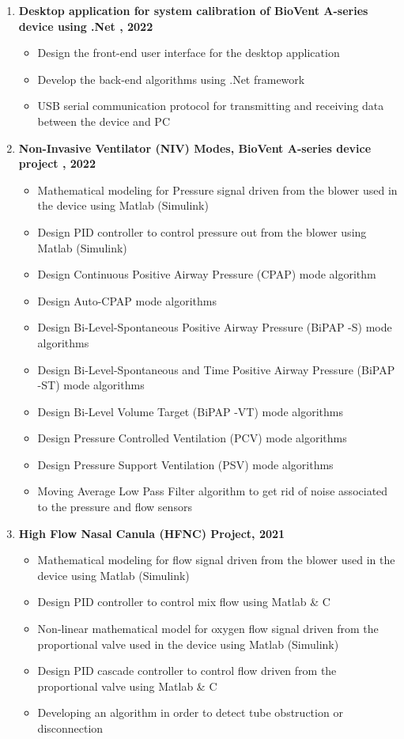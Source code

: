 \documentclass[a4paper,12pt,final]{memoir}
\begin{document}
\begin{enumerate}
\item \textbf{Desktop application for system calibration of BioVent A-series device using .Net , 2022} 
\begin{itemize}
\item Design the front-end user interface for the desktop application
\item Develop the back-end algorithms using .Net framework
\item USB serial communication protocol for transmitting and receiving data between the device and PC
\end{itemize}
\item \textbf{Non-Invasive Ventilator (NIV) Modes, BioVent A-series device project , 2022}
\begin{itemize}
	\item Mathematical modeling for Pressure signal driven from the blower used in the device using Matlab (Simulink)
	\item Design PID controller to control pressure out from the blower using Matlab (Simulink) 
    \item Design Continuous Positive Airway Pressure (CPAP) mode algorithm 
    \item Design Auto-CPAP mode algorithms 
    \item Design Bi-Level-Spontaneous Positive Airway Pressure (BiPAP -S) mode algorithms 
    \item Design Bi-Level-Spontaneous and Time Positive Airway Pressure (BiPAP -ST) mode algorithms 
    \item Design Bi-Level Volume Target (BiPAP -VT) mode algorithms 
    \item Design Pressure Controlled Ventilation (PCV) mode algorithms 
    \item Design Pressure Support Ventilation (PSV) mode algorithms 
    \item Moving Average Low Pass Filter algorithm to get rid of noise associated to the pressure and flow sensors
\end{itemize}
\item \textbf{High Flow Nasal Canula (HFNC) Project, 2021}
\begin{itemize}
    \item Mathematical modeling for flow signal driven from the blower used in the device using Matlab (Simulink) 
    \item Design PID controller to control mix flow using Matlab \& C 
    \item Non-linear mathematical model for oxygen flow signal driven from the  proportional valve used in the device using Matlab (Simulink) 
    \item Design PID cascade controller to control flow driven from the proportional valve using Matlab \& C  
    \item Developing an algorithm in order to detect tube obstruction or disconnection 
\end{itemize}
\end{enumerate}
\end{document}
